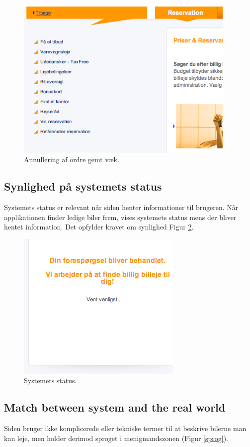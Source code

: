 \documentclass[a4paper]{article}
\begin{document}
\begin{figure}[htbp]
  \begin{center}
    \includegraphics[width=400px]{3.png}
  \end{center}
  \caption{Annullering af ordre gemt væk.}
  \label{annullering}
\end{figure}

\subsection{Synlighed på systemets status}
Systemets status er relevant når siden henter informationer til brugeren. Når
applikationen finder ledige biler frem, vises systemets status mens der bliver
hentet information. Det opfylder kravet om synlighed Figur \ref{status}.

\begin{figure}[htbp]
  \begin{center}
    \includegraphics{4.png}
  \end{center}
  \caption{Systemets status.}
  \label{status}
\end{figure}
\subsection{Match between system and the real world}
Siden bruger ikke komplicerede eller tekniske termer til at beskrive bilerne man
kan leje, men holder derimod sproget i menigmandszonen (Figur \ref{sprog}).
\end{document}

